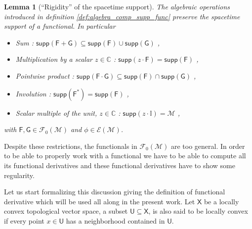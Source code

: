 \documentclass[11pt]{book}
\newcommand{\supp}{\mathsf{supp}}
\newcommand{\Ecal}{\mathcal{E}}
\newcommand{\Fcal}{\mathcal{F}}
\newcommand{\Mcal}{\mathcal{M}}
\newcommand{\Cbb}{\mathbb{C}}
\newcommand{\Ibb}{\mathbb{I}}
\newcommand{\Fsf}{\mathsf{F}}
\newcommand{\Gsf}{\mathsf{G}}
\newcommand{\Usf}{\mathsf{U}}
\newcommand{\Xsf}{\mathsf{X}}
\theoremstyle{break}
\newtheorem{lemma}{Lemma}[chapter]
\begin{document}
\begin{lemma}[``Rigidity'' of the spacetime support]
The algebraic operations introduced in definition \ref{def:algebra_comp_supp_func} preserve the spacetime support of a functional. In particular
%
\begin{itemize}
\item Sum : $\supp(\Fsf + \Gsf) \subseteq \supp(\Fsf) \cup \supp(\Gsf)$ ,
\item Multiplication by a scalar $z\in\Cbb$ : $\supp(z\cdot\Fsf) = \supp(\Fsf)$ ,
\item Pointwise product : $\supp(\Fsf \cdot \Gsf) \subseteq \supp(\Fsf) \cap \supp(\Gsf)$ ,
\item Involution : $\supp(\Fsf^\ast) = \supp(\Fsf)$ ,
\item Scalar multiple of the unit, $z\in\Cbb$ : $\supp(z\cdot\Ibb) = \Mcal$ ,
\end{itemize}
%
with $\Fsf, \Gsf \in \Fcal_0(\Mcal)$ and $\phi \in \Ecal(\Mcal)$.
\end{lemma}


Despite these restrictions, the functionals in $\Fcal_0(\Mcal)$ are too general. In order to be able to properly work with a functional we have to be able to compute all its functional derivatives and these functional derivatives have to show some regularity.


Let us start formalizing this discussion giving the definition of functional derivative which will be used all along in the present work. Let $\Xsf$ be a locally convex topological vector space, a subset $\Usf \subseteq \Xsf$, is also said to be locally convex if every point $x \in \Usf$ has a neighborhood contained in $\Usf$. 
\end{document}
